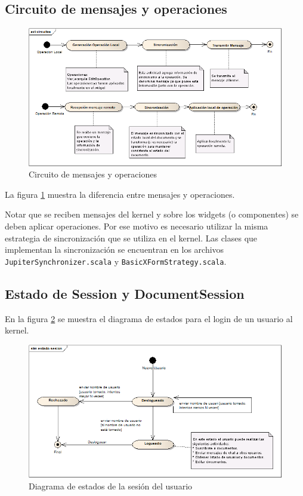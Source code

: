 \documentclass[12pt,a4paper]{article}
\begin{document}
\subsection{Circuito de mensajes y operaciones}

	\begin{figure}[!ht]
		\begin{center}
			\includegraphics[width=14cm]{circuitos-mensajes.png}
			\caption{\label{circuitos-mensajes} Circuito de mensajes y operaciones }
		\end{center}
	\end{figure}


La figura \ref{circuitos-mensajes} muestra la diferencia entre mensajes y operaciones.

Notar que se reciben mensajes del kernel y sobre los widgets (o componentes) se deben aplicar operaciones. Por ese motivo es necesario 
utilizar la misma estrategia de sincronización que se utiliza en el kernel. Las clases que implementan la sincronización se 
encuentran en los archivos 
\texttt{JupiterSynchronizer.scala}
y \texttt{BasicXFormStrategy.scala}.

\subsection{Estado de Session y DocumentSession}

En la figura \ref{estado-sesion} se muestra el diagrama de estados para el login de un usuario al kernel.

	\begin{figure}[!ht]
		\begin{center}
			\includegraphics[width=14cm]{estado-sesion.png}
			\caption{\label{estado-sesion} Diagrama de estados de la sesión del usuario }
		\end{center}
	\end{figure}
\end{document}

